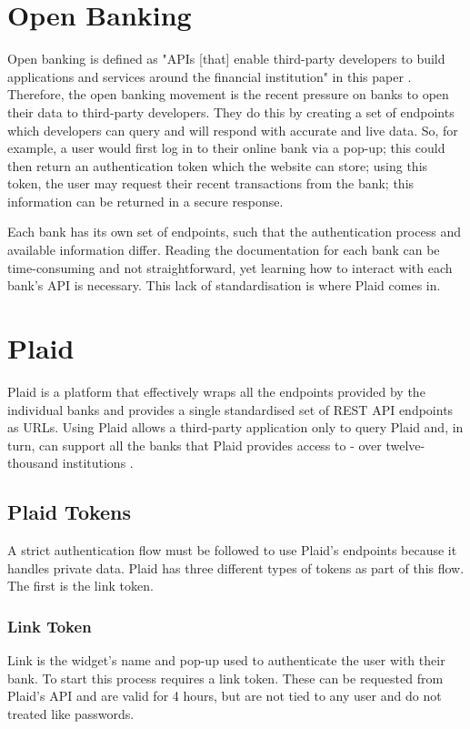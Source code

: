 \section{Open Banking}
\label{sec:open-banking}
Open banking is defined as "APIs [that] enable third-party developers to build applications and services around the financial institution" in this paper \cite{OpenBankingDefinition}. Therefore, the open banking movement is the recent pressure on banks to open their data to third-party developers. They do this by creating a set of endpoints which developers can query and will respond with accurate and live data. So, for example, a user would first log in to their online bank via a pop-up; this could then return an authentication token which the website can store; using this token, the user may request their recent transactions from the bank; this information can be returned in a secure response. 

Each bank has its own set of endpoints, such that the authentication process and available information differ. Reading the documentation for each bank can be time-consuming and not straightforward, yet learning how to interact with each bank's API is necessary. This lack of standardisation is where Plaid \cite{Plaid} comes in.

\section{Plaid}
\label{sec:plaid}
Plaid is a platform that effectively wraps all the endpoints provided by the individual banks and provides a single standardised set of REST API endpoints as URLs. Using Plaid allows a third-party application only to query Plaid and, in turn, can support all the banks that Plaid provides access to - over twelve-thousand institutions \cite{PlaidInstitutions}.

\subsection{Plaid Tokens}
A strict authentication flow must be followed to use Plaid's endpoints because it handles private data. Plaid has three different types of tokens as part of this flow. The first is the link token.

\subsubsection{Link Token}
Link is the widget's name and pop-up used to authenticate the user with their bank. To start this process requires a link token. These can be requested from Plaid's API and are valid for 4 hours, but are not tied to any user and do not treated like passwords.

